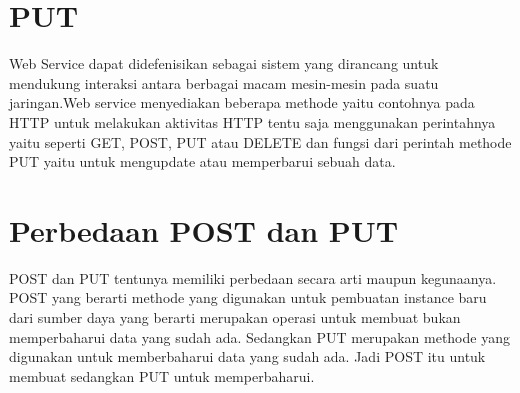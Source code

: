 \section{PUT}
Web Service dapat didefenisikan sebagai sistem yang dirancang untuk mendukung interaksi antara berbagai macam mesin-mesin pada suatu jaringan.Web service menyediakan beberapa methode yaitu contohnya pada  HTTP untuk melakukan aktivitas HTTP tentu saja menggunakan perintahnya yaitu seperti  GET, POST, PUT atau DELETE dan fungsi dari perintah methode PUT yaitu untuk mengupdate atau memperbarui sebuah data.
\section{Perbedaan POST dan PUT}
POST dan PUT tentunya memiliki perbedaan secara arti maupun kegunaanya. POST yang berarti methode yang digunakan untuk pembuatan
instance baru dari sumber daya yang berarti merupakan operasi untuk membuat bukan memperbaharui data yang sudah ada. 
Sedangkan PUT merupakan methode yang digunakan untuk memberbaharui data yang sudah ada. Jadi POST itu untuk membuat 
sedangkan PUT untuk memperbaharui.